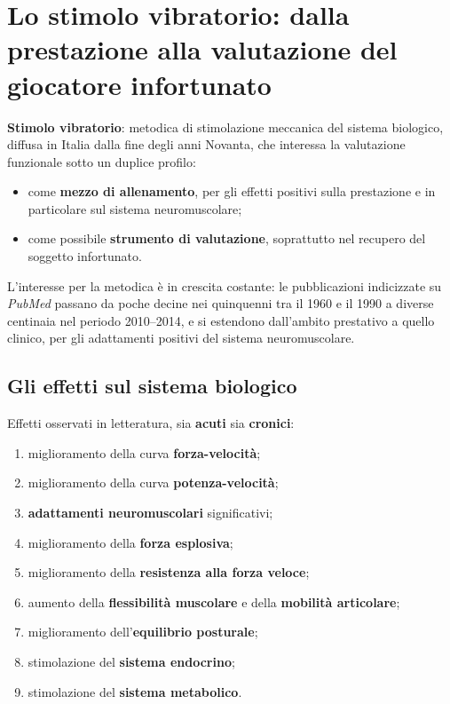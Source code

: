 \chapter[Lo stimolo vibratorio]{Lo stimolo vibratorio: dalla prestazione alla valutazione del
giocatore infortunato}

\textbf{Stimolo vibratorio}: metodica di stimolazione meccanica del sistema biologico, diffusa in
Italia dalla fine degli anni Novanta, che interessa la valutazione funzionale sotto un duplice
profilo:
\begin{itemize}
  \item come \textbf{mezzo di allenamento}, per gli effetti positivi sulla prestazione e in
    particolare sul sistema neuromuscolare;
  \item come possibile \textbf{strumento di valutazione}, soprattutto nel recupero del soggetto
    infortunato.
\end{itemize}
L'interesse per la metodica è in crescita costante: le pubblicazioni indicizzate su \textit{PubMed}
passano da poche decine nei quinquenni tra il 1960 e il 1990 a diverse centinaia nel periodo
2010--2014, e si estendono dall'ambito prestativo a quello clinico, per gli adattamenti positivi del
sistema neuromuscolare.

\section{Gli effetti sul sistema biologico}

Effetti osservati in letteratura, sia \textbf{acuti} sia \textbf{cronici}:
\begin{enumerate}
  \item miglioramento della curva \textbf{forza-velocità};
  \item miglioramento della curva \textbf{potenza-velocità};
  \item \textbf{adattamenti neuromuscolari} significativi;
  \item miglioramento della \textbf{forza esplosiva};
  \item miglioramento della \textbf{resistenza alla forza veloce};
  \item aumento della \textbf{flessibilità muscolare} e della \textbf{mobilità articolare};
  \item miglioramento dell'\textbf{equilibrio posturale};
  \item stimolazione del \textbf{sistema endocrino};
  \item stimolazione del \textbf{sistema metabolico}.
\end{enumerate}

